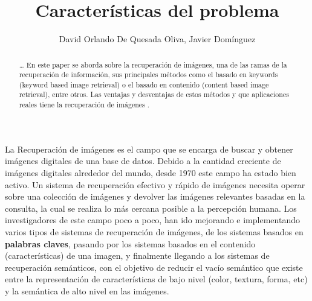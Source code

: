 \documentclass{llncs}
\begin{document}
%
\begin{abstract}
    \dots
    En este paper se aborda sobre la recuperaci\'on de im\'agenes, una de las ramas de la
    recuperaci\'on de informaci\'on, sus principales m\'etodos como el basado en keywords
    (keyword based image retrieval) o el basado en contenido (content based image retrieval),
    entre otros. Las ventajas y desventajas de estos m\'etodos y que aplicaciones reales tiene 
    la recuperaci\'on de im\'agenes .

\end{abstract}

\tableofcontents
%

  

%
\title{Caracter\'isticas del problema}
%
\titlerunning{}  %
%



%
\author{David Orlando De Quesada Oliva, Javier Dom\'inguez}
%
%

%

\maketitle



La Recuperación de im\'agenes es el campo que se encarga de buscar y obtener imágenes 
digitales de una base  de datos. Debido a la cantidad creciente de imágenes digitales 
alrededor del mundo, desde 1970 este campo ha estado bien activo. Un sistema de 
recuperación efectivo y rápido de imágenes necesita operar sobre una colección de 
imágenes y devolver las imágenes relevantes basadas en la consulta, la cual 
se realiza lo más cercana posible a la percepción humana. Los investigadores de este 
campo poco a poco, han ido mejorando e implementando varios tipos de sistemas de recuperación 
de imágenes, de los sistemas basados en \textbf{palabras claves}, pasando por los sistemas 
basados en el contenido (características) de una imagen, y finalmente llegando a los 
sistemas de recuperación semánticos, con el objetivo de reducir el vacío semántico que 
existe entre la representación de características de bajo nivel (color, textura, forma, etc) y 
la semántica de alto nivel en las imágenes.
\end{document}

